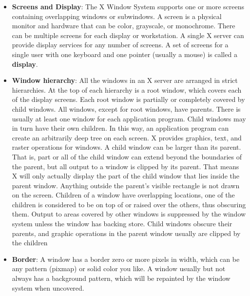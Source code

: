 \documentclass{report}
\begin{document}
\begin{itemize}
            \begin{align*}
                (R,G,B)
            .\end{align*}
            Each component uses 8 bits, so each ranges from 0 to 255.
        \item \textbf{Screens and Display}: The X Window System supports one or more screens containing overlapping windows or subwindows. A screen is a physical monitor and hardware that can be color, grayscale, or monochrome. There can be multiple screens for each display or workstation. A single X server can provide display services for any number of screens. A set of screens for a single user with one keyboard and one pointer (usually a mouse) is called a \textbf{display}.
        \item \textbf{Window hierarchy}: All the windows in an X server are arranged in strict hierarchies. At the top of each hierarchy is a root window, which covers each of the display screens. Each root window is partially or completely covered by child windows. All windows, except for root windows, have parents. There is usually at least one window for each application program. Child windows may in turn have their own children. In this way, an application program can create an arbitrarily deep tree on each screen. X provides graphics, text, and raster operations for windows.  
            \bigbreak \noindent 
            A child window can be larger than its parent. That is, part or all of the child window can extend beyond the boundaries of the parent, but all output to a window is clipped by its parent. 
            \bigbreak \noindent 
            That means X will only actually display the part of the child window that lies inside the parent window. Anything outside the parent’s visible rectangle is not drawn on the screen.
            \bigbreak \noindent 
            Children of a window have overlapping locations, one of the children is considered to be on top of or raised over the others, thus obscuring them. Output to areas covered by other windows is suppressed by the window system unless the window has backing store. 
            \bigbreak \noindent 
            Child windows obscure their parents, and graphic operations in the parent window usually are clipped by the children
        \item \textbf{Border}: A window has a border zero or more pixels in width, which can be any pattern (pixmap) or solid color you like. A window usually but not always has a background pattern, which will be repainted by the window system when uncovered.

\end{itemize}
\end{document}
